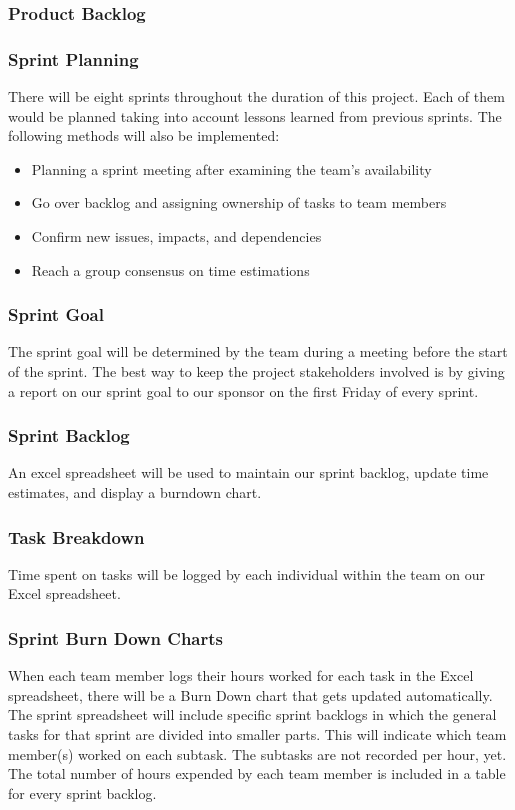 \subsubsection{Product Backlog}

\subsubsection{Sprint Planning}
There will be eight sprints throughout the duration of this project. Each of them would be planned taking into account lessons learned from previous sprints. The following methods will also be implemented:
\begin{itemize}
  \item Planning a sprint meeting after examining the team's availability
  \item Go over backlog and assigning ownership of tasks to team members
  \item Confirm new issues, impacts, and dependencies
  \item Reach a group consensus on time estimations
\end{itemize}

\subsubsection{Sprint Goal}
The sprint goal will be determined by the team during a meeting before the start of the sprint. The best way to keep the project stakeholders involved is by giving a report on our sprint goal to our sponsor on the first Friday of every sprint.

\subsubsection{Sprint Backlog}
{An excel spreadsheet will be used to maintain our sprint backlog, update time estimates, and display a burndown chart.}

\subsubsection{Task Breakdown}
Time spent on tasks will be logged by each individual within the team on our Excel spreadsheet.

\subsubsection{Sprint Burn Down Charts}
When each team member logs their hours worked for each task in the Excel spreadsheet, there will be a Burn Down chart that gets updated automatically. The sprint spreadsheet will include specific sprint backlogs in which the general tasks for that sprint are divided into smaller parts. This will indicate which team member(s) worked on each subtask. The subtasks are not recorded per hour, yet. The total number of hours expended by each team member is included in a table for every sprint backlog.

